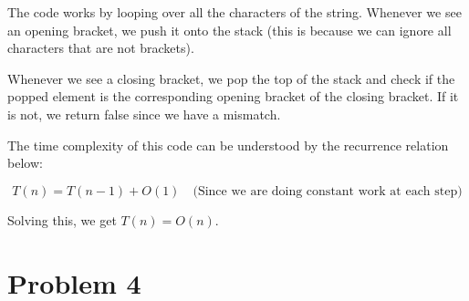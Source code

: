 \documentclass{cs1204}
\begin{document}
The code works by looping over all the characters of the string. Whenever we see an opening bracket, we push it onto the stack (this is because we can ignore all characters that are not brackets).

Whenever we see a closing bracket, we pop the top of the stack and check if the popped element is the corresponding opening bracket of the closing bracket. If it is not, we return false since we have a mismatch.

The time complexity of this code can be understood by the recurrence relation below:

\[ T(n) = T(n-1) + O(1) \quad \text{(Since we are doing constant work at each step)} \]

Solving this, we get $T(n) = O(n)$.


\section*{Problem 4}
\end{document}
